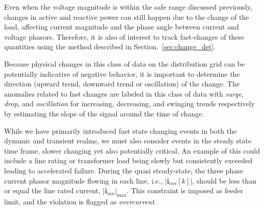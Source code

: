 \documentclass[twocolumn]{IEEEtran}
\newcommand{\mup}{\mu \text{PMU}}
\newcommand{\mr}{\mathrm}
\newcommand{\mb}{\mathbf}
\begin{document}
Even when the voltage magnitude is within the safe range discussed previously, changes in active and reactive power can still happen due to the change of the load, affecting current magnitude and the phase angle between current and voltage phasors. Therefore, it is also of interest to track fast-changes of these quantities using the method described in Section.~\ref{sec:change_det}.

Because physical changes in this class of data on the distribution grid can be potentially indicative of negative behavior, it is important to determine the direction (upward trend, downward trend or oscillation) of the change.
% 
The anomalies related to fast changes are labeled in this class of data with {\it  surge}, {\it drop}, and {\it oscillation} for increasing, decreasing, and swinging trends respectively by estimating the slope of the signal around the time of change.

While we have primarily introduced fast state changing events in both the dynamic and transient realms, we must also consider events in the steady state time frame, slower changing yet also potentially critical. An example of this could include a line rating or transformer load being slowly but consistently exceeded leading to accelerated failure. During the quasi steady-state, the three phase current phasor magnitude flowing in each line, i.e., $|\mb{i}_{mn}[k]|$, should be less than or equal the line rated current, $|\mb{i}_{mn}|_{\max}$. This constraint is imposed as feeder limit, and the violation is flagged as \textit{overcurrent}.
\end{document}
